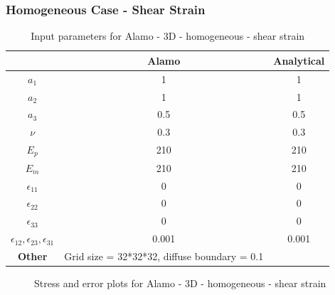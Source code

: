 \documentclass[12pt, a4paper]{report}
\begin{document}
\newpage

\subsubsection{Homogeneous Case - Shear Strain}
\begin{table}[H]
    \centering
    \begin{tabular}{|c|c|c|}
        \hline
        & \textbf{Alamo} &\textbf{Analytical}\\
        \hline
        \textbf{$a_1$} & 1 & 1 \\
        \hline
        \textbf{$a_2$} & 1 & 1 \\
        \hline
        \textbf{$a_3$} & 0.5 & 0.5 \\
        \hline
        \textbf{$\nu$} & 0.3 & 0.3 \\
        \hline
        \textbf{$E_p$} & 210 & 210 \\
        \hline
        \textbf{$E_m$} & 210 & 210 \\
        \hline
        \textbf{$\epsilon_{11}$} & 0 & 0 \\
        \hline
        \textbf{$\epsilon_{22}$} & 0 & 0 \\
        \hline
        \textbf{$\epsilon_{33}$} & 0 & 0 \\
        \hline
        \textbf{$\epsilon_{12}, \epsilon_{23}, \epsilon_{31}$} & 0.001 & 0.001 \\
        \hline
        \textbf{Other} & Grid size = 32*32*32, diffuse boundary = 0.1 &  \\
        \hline
    \end{tabular}
    \caption{Input parameters for Alamo - 3D - homogeneous - shear strain}
\end{table}

\begin{figure}[htbp]
  \centering
  \hfill
  \caption{Stress and error plots for Alamo - 3D - homogeneous - shear strain}
\end{figure}
\end{document}
